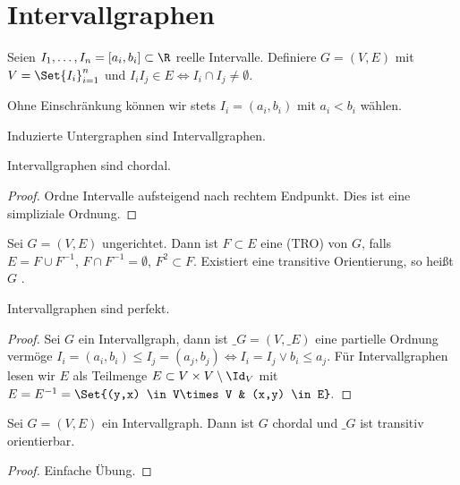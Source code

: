 \section{Intervallgraphen}


\begin{df}
    Seien $I_1, \dotsc, I_n = [a_i, b_i] \subset \R$ reelle Intervalle.
    Definiere $G = (V, E)$ mit $V = \Set{I_i}_{i=1}^n$ und $I_iI_j \in E \iff I_i \cap I_j \neq \emptyset$.
    \begin{note}
        Ohne Einschränkung können wir stets $I_i = (a_i, b_i)$ mit $a_i < b_i$ wählen.

        Induzierte Untergraphen sind Intervallgraphen.
    \end{note}
\end{df}

\begin{lem}
    Intervallgraphen sind chordal.
    \begin{proof}
        Ordne Intervalle aufsteigend nach rechtem Endpunkt.
        Dies ist eine simpliziale Ordnung.
    \end{proof}
\end{lem}

\begin{df}
    Sei $G = (V, E)$ ungerichtet.
    Dann ist $F \subset E$ eine  (TRO) von $G$, falls $E = F \cup F^{-1}$, $F \cap F^{-1} = \emptyset$, $F^2 \subset F$.
    Existiert eine transitive Orientierung, so heißt $G$ .
\end{df}

\begin{st}
    Intervallgraphen sind perfekt.
    \begin{proof}
        Sei $G$ ein Intervallgraph, dann ist $\_G = (V, \_E)$ eine partielle Ordnung vermöge
        \begin{math}
            I_i = (a_i, b_i) \le I_j = (a_j, b_j) \iff I_i = I_j \lor b_i \le a_j.
        \end{math}
        Für Intervallgraphen lesen wir $E$ als Teilmenge $E \subset V \times V \setminus \Id_V$ mit
        \begin{math}
            E = E^{-1} = \Set{(y,x) \in V\times V & (x,y) \in E}.
        \end{math}
    \end{proof}
\end{st}

\begin{lem}
    Sei $G = (V,E)$ ein Intervallgraph.
    Dann ist $G$ chordal und $\_G$ ist transitiv orientierbar.
    \begin{proof}
        Einfache Übung.
    \end{proof}
\end{lem}

